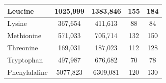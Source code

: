 \begin{table}[H]
\begin{tabular}{|l|cccc|}
Leucine                      & \multicolumn{1}{c|}{1025,999}        & \multicolumn{1}{c|}{1383,846}                                                             & \multicolumn{1}{c|}{155}                                                                  & 184                                                                                       \\ \hline
Lysine                       & \multicolumn{1}{c|}{367,654}         & \multicolumn{1}{c|}{411,613}                                                              & \multicolumn{1}{c|}{88}                                                                   & 84                                                                                        \\ \hline
Methionine                   & \multicolumn{1}{c|}{571,033}         & \multicolumn{1}{c|}{705,714}                                                              & \multicolumn{1}{c|}{132}                                                                  & 150                                                                                       \\ \hline
Threonine                    & \multicolumn{1}{c|}{169,031}         & \multicolumn{1}{c|}{187,023}                                                              & \multicolumn{1}{c|}{112}                                                                  & 128                                                                                       \\ \hline
Tryptophan                   & \multicolumn{1}{c|}{497,987}         & \multicolumn{1}{c|}{676,682}                                                              & \multicolumn{1}{c|}{70}                                                                   & 78                                                                                        \\ \hline
Phenylalaline                & \multicolumn{1}{c|}{5077,823}        & \multicolumn{1}{c|}{6309,081}                                                             & \multicolumn{1}{c|}{120}                                                                  & 130                                                                                       \\ \hline
\end{tabular}
\end{table}

